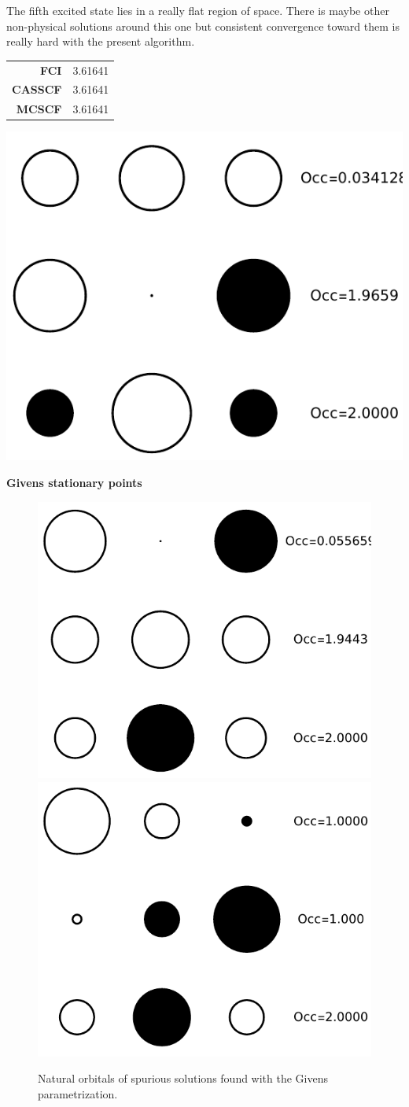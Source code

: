 \documentclass[11pt,a4paper]{article}
\begin{document}
The fifth excited state lies in a really flat region of space. There is maybe other non-physical solutions around this one but consistent convergence toward them is really hard with the present algorithm.
\begin{minipage}{0.3\textwidth}
  \centering
  \begin{tabular}{r|c}
    \textbf{FCI} & 3.61641 \\
    \textbf{CASSCF} & 3.61641 \\
    \textbf{MCSCF} & 3.61641
  \end{tabular}
\end{minipage}
\hfill
\begin{minipage}{0.6\textwidth}
  \centering
  \includegraphics[width=0.49\linewidth]{Figures/H3_ES5_CAS_NO}
  \label{fig:H3_ES5_NO}
\end{minipage}

\textbf{Givens stationary points}

\begin{figure}
  \centering
  \includegraphics[width=0.28\linewidth]{Figures/H3_Givens1_NO}
  \hspace{0.65cm}
  \includegraphics[width=0.28\linewidth]{Figures/H3_Givens2_NO}
  \caption{
    Natural orbitals of spurious solutions found with the Givens parametrization.
    \label{fig:H2ooCIS}}
\end{figure}
\end{document}
